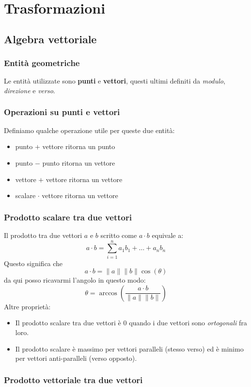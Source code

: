 \chapter{Trasformazioni}
\section{Algebra vettoriale}
\subsection{Entit\`a geometriche}
Le entit\`a utilizzate sono \textbf{punti} e \textbf{vettori}, questi ultimi definiti da
\emph{modulo}, \emph{direzione} e \emph{verso}.

\subsection{Operazioni su punti e vettori}
Definiamo qualche operazione utile per queste due entit\`a:
\begin{itemize}
	\item punto $+$ vettore ritorna un punto
	\item punto $-$ punto ritorna un vettore
	\item vettore $+$ vettore ritorna un vettore
	\item scalare $\cdot$ vettore ritorna un vettore
\end{itemize}

\subsection{Prodotto scalare tra due vettori}
Il prodotto tra due vettori $a$ e $b$ scritto come $a \cdot b$ equivale a:
\[ a \cdot b = \sum_{i=1}^n a_1 b_1 + \dots + a_n b_n  \]
Questo significa che
\[ a \cdot b = \| a \| \| b \| \cos{(\theta)} \]
da qui posso ricavarmi l'angolo in questo modo:
\[ \theta = \arccos{\left( \frac{a \cdot b}{\| a \| \| b \|} \right)} \]
Altre propriet\`a:
\begin{itemize}
	\item Il prodotto scalare tra due vettori \`e 0 quando i due vettori sono \emph{ortogonali}
	      fra loro.
	\item Il prodotto scalare \`e massimo per vettori paralleli (stesso verso) ed \`e minimo
	      per vettori anti-paralleli (verso opposto).
\end{itemize}

\subsection{Prodotto vettoriale tra due vettori}


